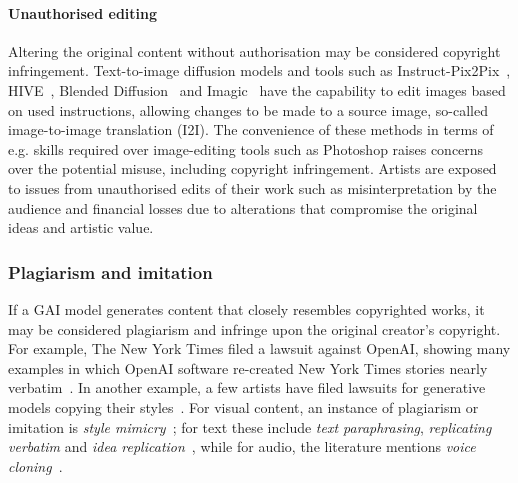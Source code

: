 \documentclass[conference,table]{IEEEtran}
\begin{document}
        \paragraph{Unauthorised editing} Altering the original content without authorisation may be considered copyright infringement. 
        Text-to-image diffusion models and tools such as Instruct-Pix2Pix~\cite{brooks_instructpix2pix_2023}, HIVE~\cite{zhang_hive_2023}, Blended Diffusion~\cite{avrahami_blended_2022} and Imagic~\cite{kawar_imagic_2023} have the capability to edit images based on used instructions, allowing changes to be made to a source image, so-called image-to-image translation (I2I). 
        The convenience of these methods in terms of e.g. skills required over image-editing tools such as Photoshop raises concerns over the potential misuse, including copyright infringement. 
        Artists are exposed to issues from unauthorised edits of their work such as misinterpretation by the audience and financial losses due to alterations that compromise the original ideas and artistic value. 

\subsubsection{Plagiarism and imitation} 
If a GAI model generates content that closely resembles copyrighted works, it may be considered plagiarism and infringe upon the original creator's copyright. 
For example, The New York Times filed a lawsuit against OpenAI, showing many examples in which OpenAI software re-created New York Times stories nearly verbatim~\cite{grynbaum_new_2023}. 
In another example, a few artists have filed lawsuits for generative models copying their styles~\cite{brittain_judge_2023}.
For visual content, an instance of plagiarism or imitation is \textit{style mimicry}~\cite{gal_image_2022}; for text these include \textit{text paraphrasing}, \textit{replicating verbatim} and \textit{idea replication}~\cite{lee_language_2023}, while for audio, the literature mentions \textit{voice cloning}~\cite{qian_autovc_2019}.
\end{document}
